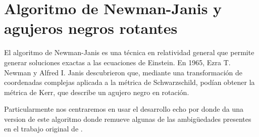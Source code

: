 \section{Algoritmo de Newman-Janis y agujeros negros rotantes}
El algoritmo de Newman-Janis es una técnica en relatividad general que permite generar soluciones exactas a las ecuaciones de Einstein. En 1965, Ezra T. Newman y Alfred I. Janis \cite{newman-1965} descubrieron que, mediante una transformación de coordenadas complejas aplicada a la métrica de Schwarzschild, podían obtener la métrica de Kerr, que describe un agujero negro en rotación.

Particularmente nos centraremos en usar el desarrollo echo por \cite{drake-2000} donde da una version de este algoritmo donde remueve algunas de las ambigüedades  presentes en el trabajo original de \cite[text]{newman-1965}.

